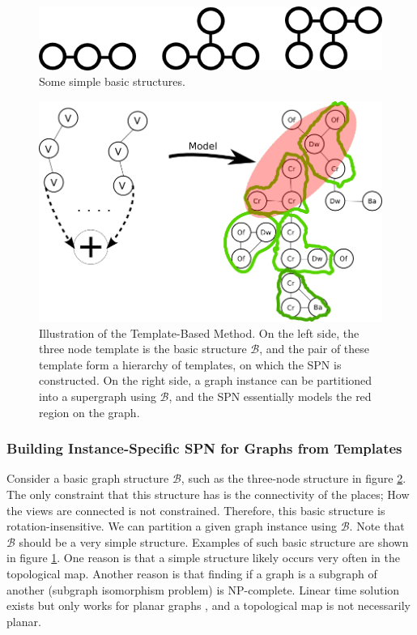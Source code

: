\documentclass[10pt, titlepage]{article}
\theoremstyle{definition}
\begin{document}
\begin{figure}[!htb]
    \centering
    \captionsetup{width=.8\linewidth}
    \includegraphics[scale=0.5]{images/example_basics.png}
    \caption{Some simple basic structures.}
    \label{fig:basic_struct}
\end{figure}


\begin{figure}[!htb]
    \centering
    \captionsetup{width=.8\linewidth}
    \includegraphics[scale=0.4]{images/big_graph.png}
    \caption{Illustration of the Template-Based Method. On the left side, the three node template is the basic structure $\mathcal{B}$, and the pair of these template form a hierarchy of templates, on which the SPN is constructed. On the right side, a graph instance can be partitioned into a supergraph using $\mathcal{B}$, and the SPN essentially models the red region on the graph.}
    \label{fig:tmpmod}
\end{figure}

\subsubsection{Building Instance-Specific SPN for Graphs from Templates}\label{section:buildtmplspn}
Consider a basic graph structure $\mathcal{B}$, such as the three-node structure in figure \ref{fig:tmpmod}. The only constraint that this structure has is the connectivity of the places; How the views are connected is not constrained. Therefore, this basic structure is rotation-insensitive. We can partition a given graph instance using $\mathcal{B}$. Note that $\mathcal{B}$ should be a very simple structure. Examples of such basic structure are shown in figure \ref{fig:basic_struct}. One reason is that a simple structure likely occurs very often in the topological map. Another reason is that finding if a graph is a subgraph of another (subgraph isomorphism problem) is NP-complete. Linear time solution exists but only works for planar graphs \cite{eppstein1995subgraph}, and a topological map is not necessarily planar.
\end{document}
